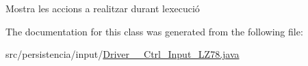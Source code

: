 Mostra les accions a realitzar durant l\textquotesingle{}execució 



The documentation for this class was generated from the following file\+:\begin{DoxyCompactItemize}
\item 
src/persistencia/input/\hyperlink{Driver____Ctrl__Input__LZ78_8java}{Driver\+\_\+\+\_\+\+Ctrl\+\_\+\+Input\+\_\+\+L\+Z78.\+java}\end{DoxyCompactItemize}
